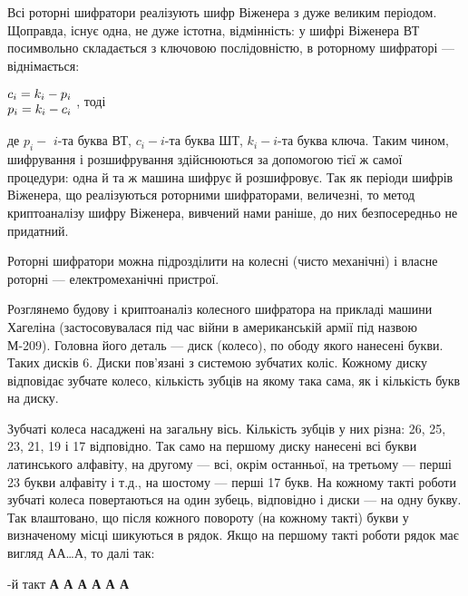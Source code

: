 Всі роторні шифратори реалізують шифр Віженера з дуже великим періодом.
Щоправда, існує одна, не дуже істотна, відмінність: у шифрі Віженера ВТ
посимвольно складається з ключовою послідовністю, в роторному шифраторі ---
віднімається:


\bigskip

{\centering
 $\begin{matrix}{c_{{i}}=k_{{i}}-p_{{i}}}\hfill\null
\\p_{{i}}=k_{{i}}-c_{{i}}\hfill\null \end{matrix}\hfill $  , тоді
\par}


\bigskip

де  ${p_{{i}}-}$  ${i}${}-та буква ВТ,   ${c_{{i}}-i}${}-та буква ШТ, 
${k_{{i}}-i}${}-та буква ключа. Таким чином, шифрування і розшифрування
здійснюються за допомогою тієї ж самої процедури: одна й та ж машина шифрує й
розшифровує. Так як періоди шифрів Віженера, що реалізуються роторними
шифраторами, величезні, то метод криптоаналізу шифру Віженера, вивчений нами
раніше, до них безпосередньо не придатний.

Роторні шифратори можна підрозділити на колесні (чисто механічні) і власне
роторні --- електромеханічні пристрої.

Розглянемо будову і криптоаналіз колесного шифратора на прикладі машини Хагеліна
(застосовувалася під час війни в американській армії під назвою М-209). Головна
його деталь --- диск (колесо), по ободу якого нанесені букви. Таких дисків 6.
Диски пов’язані з системою зубчатих коліс. Кожному диску відповідає зубчате
колесо, кількість зубців на якому така сама, як і кількість букв на диску. 

Зубчаті колеса насаджені на загальну вісь. Кількість зубців у них різна: 26, 25,
23, 21, 19 і 17 відповідно. Так само на першому диску нанесені всі букви
латинського алфавіту, на другому --- всі, окрім останньої, на третьому --- перші 23
букви алфавіту і т.д., на шостому --- перші 17 букв. На кожному такті роботи
зубчаті колеса повертаються на один зубець, відповідно і диски --- на одну букву.
Так влаштовано, що після кожного повороту  (на кожному такті)  букви у
визначеному  місці  шикуються  в рядок. Якщо на першому  такті роботи рядок має
вигляд АА…А, то далі так:

\begin{figure}
\centering
\begin{minipage}{0.0161in}

\bigskip
\end{minipage}
\end{figure}
{-й такт  \textbf{А А А А А А}
\par}


